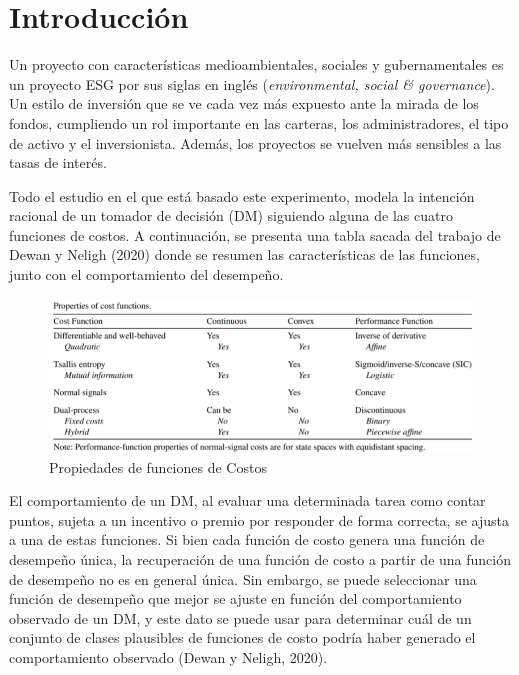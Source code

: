 \documentclass[11pt,letterpaper]{article}
\begin{document}

\tableofcontents
\newpage


\section{Introducci\'on}

Un proyecto con características medioambientales, sociales y gubernamentales es un proyecto ESG por sus siglas en inglés (\textit{environmental, social \& governance}). Un estilo de inversión que se ve cada vez más expuesto ante la mirada de los fondos, cumpliendo un rol importante en las carteras, los administradores, el tipo de activo y el inversionista. Además, los proyectos se vuelven más sensibles a las tasas de interés.

Todo el estudio en el que está basado este experimento, modela la intención racional de un tomador de decisión (DM) siguiendo alguna de las cuatro funciones de costos. 
A continuación, se presenta una tabla sacada del trabajo de Dewan y Neligh (2020) donde se resumen las características de las funciones, junto con el comportamiento del desempeño. 


        \begin{figure}[h]
            \centering
            \includegraphics[scale=1]{Propiedades funciones de costo.png}
            \caption{Propiedades de funciones de Costos}
        \end{figure}


El comportamiento de un DM, al evaluar una determinada tarea como contar puntos, sujeta a un incentivo o premio por responder de forma correcta, se ajusta a una de estas funciones. Si bien cada función de costo genera una función de desempeño única, la recuperación de una función de costo a partir de una función de desempeño no es en general única. Sin embargo, se puede seleccionar una función de desempeño que mejor se ajuste en función del comportamiento observado de un DM, y este dato se puede usar para determinar cuál de un conjunto de clases plausibles de funciones de costo podría haber generado el comportamiento observado (Dewan y Neligh, 2020). 
\end{document}
